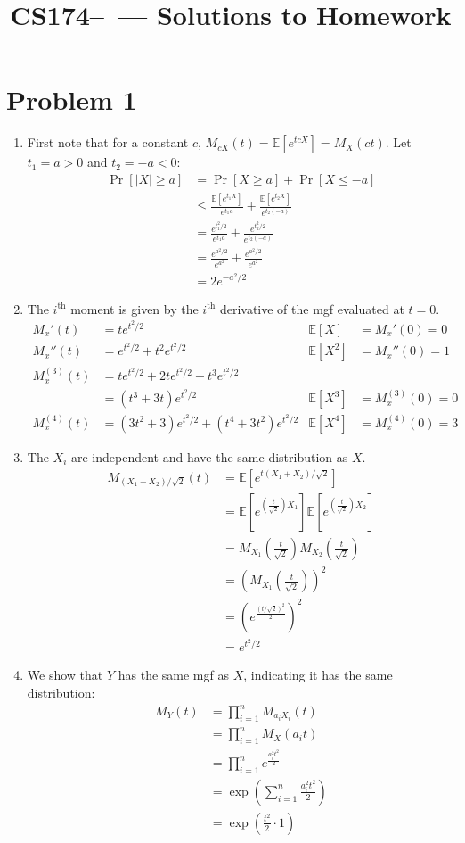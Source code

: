 \documentclass[11pt]{article}
\title{CS174--\Session\  --- Solutions to Homework \Homework}
\author{\Name}
\newcommand{\E}{\mathbb{E}}
\begin{document}
\maketitle
{}
\setcounter{problemnumber}{0}

\section*{Problem 1}
\begin{enumerate}[1.]
\item First note that for a constant $c$, $M_{cX}(t) = \E[e^{tcX}] = M_X(ct)$. Let $t_1=a>0$ and $t_2=-a<0$: \begin{align*}
\Pr[|X|\geq a] &= \Pr[X\geq a]+\Pr[X\leq -a]\\
&\leq \frac{\E[e^{t_1X}]}{e^{t_1a}} + \frac{\E[e^{t_2X}]}{e^{t_2(-a)}}\\
&= \frac{e^{t_1^2/2}}{e^{t_1a}} + \frac{e^{t_2^2/2}}{e^{t_2(-a)}}\\
&= \frac{e^{a^2/2}}{e^{a^2}} + \frac{e^{a^2/2}}{e^{a^2}}\\
&= 2e^{-a^2/2}
\end{align*}
\item The $i^{\text{th}}$ moment is given by the $i^{\text{th}}$ derivative of the mgf evaluated at $t=0$. \begin{align*}
M_x'(t) &= te^{t^2/2} & \E[X] &= M_x'(0) = 0\\
M_x''(t) &= e^{t^2/2}+t^2e^{t^2/2} & \E[X^2] &= M_x''(0) = 1\\
M_x^{(3)}(t) &= te^{t^2/2}+2te^{t^2/2}+t^3e^{t^2/2} & &\\
&= (t^3+3t)e^{t^2/2} & \E[X^3] &= M_x^{(3)}(0) = 0\\
M_x^{(4)}(t) &= (3t^2+3)e^{t^2/2}+(t^4+3t^2)e^{t^2/2} & \E[X^4] &= M_x^{(4)}(0) = 3
\end{align*}
\item The $X_i$ are independent and have the same distribution as $X$. \begin{align*}
M_{(X_1+X_2)/\sqrt{2}}(t) &= \E[e^{t(X_1+X_2)/\sqrt{2}}]\\
&= \E[e^{(\frac t{\sqrt{2}})X_1}]\E[e^{(\frac t{\sqrt{2}})X_2}]\\
&= M_{X_1}(\frac t{\sqrt2})M_{X_2}(\frac t{\sqrt2})\\
&= (M_{X_1}(\frac t{\sqrt2}))^2\\
&= (e^{\frac{(t/\sqrt2)^2}2})^2\\
&= e^{t^2/2}
\end{align*}
\item We show that $Y$ has the same mgf as $X$, indicating it has the same distribution: \begin{align*}M_Y(t) &= \prod_{i=1}^n M_{a_iX_i}(t)\\
&= \prod_{i=1}^n M_X(a_it)\\
&= \prod_{i=1}^n e^{\frac{a_i^2t^2}2}\\
&= \exp{\left(\sum_{i=1}^n \frac{a_i^2t^2}2\right)}\\
&= \exp{\left(\frac{t^2}2 \cdot 1\right)}
\end{align*}
\end{enumerate}
\end{document}
